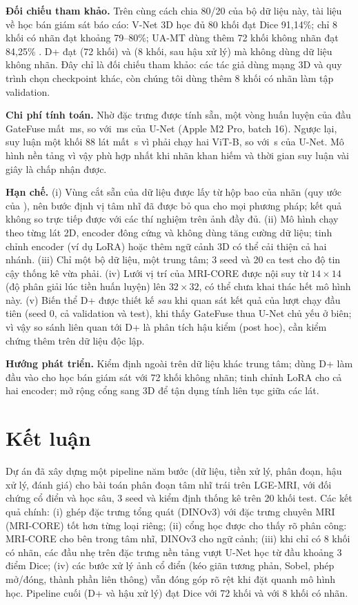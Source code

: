\documentclass[11pt,a4paper]{article}
\begin{document}
\textbf{Đối chiếu tham khảo.} Trên cùng cách chia 80/20 của bộ dữ liệu này, tài liệu về học bán giám sát báo cáo: V-Net 3D học đủ 80 khối đạt Dice 91,14\%; chỉ 8 khối có nhãn đạt khoảng 79--80\%; UA-MT dùng thêm 72 khối không nhãn đạt 84,25\% \cite{uamt,jiao2022}. D+ đạt \DiceGateEdgeFull{} (72 khối) và \DiceGateEdgeFew{} (8 khối, \DicePpGateEdgeFew{} sau hậu xử lý) mà không dùng dữ liệu không nhãn. Đây chỉ là đối chiếu tham khảo: các tác giả dùng mạng 3D và quy trình chọn checkpoint khác, còn chúng tôi dùng thêm 8 khối có nhãn làm tập validation.

\textbf{Chi phí tính toán.} Nhờ đặc trưng được tính sẵn, một vòng huấn luyện của đầu GateFuse mất \TrainMsGate\,ms, so với \TrainMsUnet\,ms của U-Net (Apple M2 Pro, batch 16). Ngược lại, suy luận một khối 88 lát mất \InferGate\,s vì phải chạy hai ViT-B, so với \InferUnet\,s của U-Net. Mô hình nền tảng vì vậy phù hợp nhất khi nhãn khan hiếm và thời gian suy luận vài giây là chấp nhận được.

\textbf{Hạn chế.} (i) Vùng cắt sẵn của dữ liệu được lấy từ hộp bao của nhãn (quy ước của \cite{uamt}), nên bước định vị tâm nhĩ đã được bỏ qua cho mọi phương pháp; kết quả không so trực tiếp được với các thí nghiệm trên ảnh đầy đủ. (ii) Mô hình chạy theo từng lát 2D, encoder đông cứng và không dùng tăng cường dữ liệu; tinh chỉnh encoder (ví dụ LoRA) hoặc thêm ngữ cảnh 3D có thể cải thiện cả hai nhánh. (iii) Chỉ một bộ dữ liệu, một trung tâm; 3 seed và 20 ca test cho độ tin cậy thống kê vừa phải. (iv) Lưới vị trí của MRI-CORE được nội suy từ $14\times14$ (độ phân giải lúc tiền huấn luyện) lên $32\times32$, có thể chưa khai thác hết mô hình này. (v) Biến thể D+ được thiết kế \emph{sau} khi quan sát kết quả của lượt chạy đầu tiên (seed 0, cả validation và test), khi thấy GateFuse thua U-Net chủ yếu ở biên; vì vậy so sánh liên quan tới D+ là phân tích hậu kiểm (post hoc), cần kiểm chứng thêm trên dữ liệu độc lập.

\textbf{Hướng phát triển.} Kiểm định ngoài trên dữ liệu khác trung tâm; dùng D+ làm đầu vào cho học bán giám sát với 72 khối không nhãn; tinh chỉnh LoRA cho cả hai encoder; mở rộng cổng sang 3D để tận dụng tính liên tục giữa các lát.

\section{Kết luận}
Dự án đã xây dựng một pipeline năm bước (dữ liệu, tiền xử lý, phân đoạn, hậu xử lý, đánh giá) cho bài toán phân đoạn tâm nhĩ trái trên LGE-MRI, với đối chứng cổ điển và học sâu, 3 seed và kiểm định thống kê trên 20 khối test. Các kết quả chính:
(i) ghép đặc trưng tổng quát (DINOv3) với đặc trưng chuyên MRI (MRI-CORE) tốt hơn từng loại riêng;
(ii) cổng học được cho thấy rõ phân công: MRI-CORE cho bên trong tâm nhĩ, DINOv3 cho ngữ cảnh;
(iii) khi chỉ có 8 khối có nhãn, các đầu nhẹ trên đặc trưng nền tảng vượt U-Net học từ đầu khoảng 3 điểm Dice;
(iv) các bước xử lý ảnh cổ điển (kéo giãn tương phản, Sobel, phép mở/đóng, thành phần liên thông) vẫn đóng góp rõ rệt khi đặt quanh mô hình học.
Pipeline cuối (D+ và hậu xử lý) đạt Dice \DicePpGateEdgeFull{} với 72 khối và \DicePpGateEdgeFew{} với 8 khối có nhãn.
\end{document}
